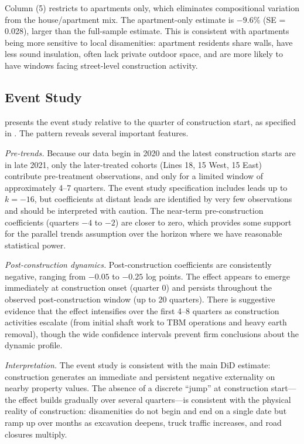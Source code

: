 \documentclass[12pt]{article}
\begin{document}
Column (5) restricts to apartments only, which eliminates compositional variation from the house/apartment mix. The apartment-only estimate is $-9.6\%$ (SE = 0.028), larger than the full-sample estimate. This is consistent with apartments being more sensitive to local disamenities: apartment residents share walls, have less sound insulation, often lack private outdoor space, and are more likely to have windows facing street-level construction activity.

\subsection{Event Study}

 presents the event study relative to the quarter of construction start, as specified in . The pattern reveals several important features.

\textit{Pre-trends.} Because our data begin in 2020 and the latest construction starts are in late 2021, only the later-treated cohorts (Lines 18, 15 West, 15 East) contribute pre-treatment observations, and only for a limited window of approximately 4--7 quarters. The event study specification includes leads up to $k = -16$, but coefficients at distant leads are identified by very few observations and should be interpreted with caution. The near-term pre-construction coefficients (quarters $-4$ to $-2$) are closer to zero, which provides some support for the parallel trends assumption over the horizon where we have reasonable statistical power.

\textit{Post-construction dynamics.} Post-construction coefficients are consistently negative, ranging from $-0.05$ to $-0.25$ log points. The effect appears to emerge immediately at construction onset (quarter 0) and persists throughout the observed post-construction window (up to 20 quarters). There is suggestive evidence that the effect intensifies over the first 4--8 quarters as construction activities escalate (from initial shaft work to TBM operations and heavy earth removal), though the wide confidence intervals prevent firm conclusions about the dynamic profile.

\textit{Interpretation.} The event study is consistent with the main DiD estimate: construction generates an immediate and persistent negative externality on nearby property values. The absence of a discrete ``jump'' at construction start---the effect builds gradually over several quarters---is consistent with the physical reality of construction: disamenities do not begin and end on a single date but ramp up over months as excavation deepens, truck traffic increases, and road closures multiply.
\end{document}
